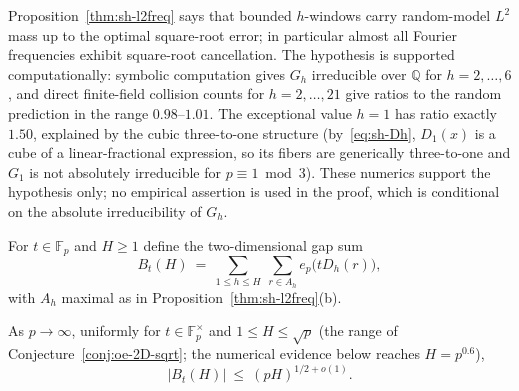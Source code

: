 \begin{remark}\label{rem:sh-l2freq-numerics}
Proposition~\ref{thm:sh-l2freq} says that bounded $h$-windows carry
random-model $L^2$ mass up to the optimal square-root error; in
particular almost all Fourier frequencies exhibit square-root
cancellation.  The hypothesis is supported computationally: symbolic
computation gives $G_h$ irreducible over $\mathbb Q$ for
$h=2,\ldots,6$, and direct finite-field collision counts for
$h=2,\ldots,21$ give ratios to the random prediction in the range
$0.98$--$1.01$.  The exceptional value $h=1$ has ratio exactly $1.50$,
explained by the cubic three-to-one structure (by~\eqref{eq:sh-Dh},
$D_1(x)$ is a cube of a linear-fractional expression, so its fibers are
generically three-to-one and $G_1$ is not absolutely irreducible for
$p\equiv1\bmod3$).  These numerics support the hypothesis only; no
empirical assertion is used in the proof, which is conditional on the
absolute irreducibility of $G_h$.
\end{remark}

For $t\in\mathbb F_p$ and $H\ge1$ define the two-dimensional gap sum
\[
 B_t(H)\ =\ \sum_{1\le h\le H}\ \sum_{r\in A_h}e_p\bigl(tD_h(r)\bigr),
\]
with $A_h$ maximal as in Proposition~\ref{thm:sh-l2freq}(b).

\begin{conjecture}
\label{conj:sh-gap2dsqrt}
As $p\to\infty$, uniformly for $t\in\mathbb F_p^{\times}$ and
$1\le H\le\sqrt p$ (the range of
Conjecture~\ref{conj:oe-2D-sqrt}; the numerical evidence below reaches
$H=p^{0.6}$),
\[
 |B_t(H)|\ \le\ (pH)^{1/2+o(1)} .
\]
\end{conjecture}


